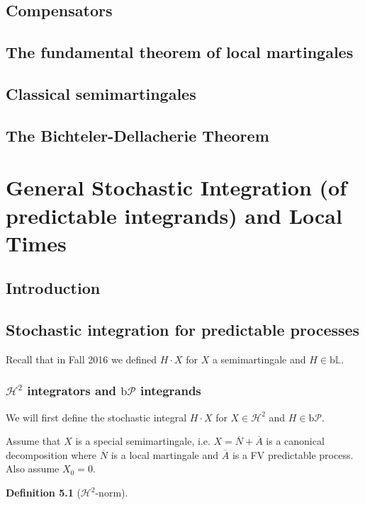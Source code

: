 \documentclass[openany,oneside]{book}
\theoremstyle{definition}
\newtheorem{defn}[thm]{Definition}
\theoremstyle{remark}
\newcommand{\sH}[1][2]{\mathcal{H}^{#1}} %
\newcommand{\pred}{\mathcal{P}} %
\newcommand{\bP}{\mathrm{b}\pred} %
\renewcommand{\L}{\mathbb{L}} %
\newcommand{\bL}{\mathrm{b}\L} %
\begin{document}
\section{Compensators}

\section{The fundamental theorem of local martingales}

\section{Classical semimartingales}

\section{The Bichteler-Dellacherie Theorem}


\chapter{General Stochastic Integration (of predictable integrands) and Local Times}

\section{Introduction}

\section{Stochastic integration for predictable processes}
Recall that in Fall 2016 we defined $H\cdot X$ for $X$ a semimartingale and $H\in \bL$.

\subsection{$\sH$ integrators and $\bP$ integrands}
We will first define the stochastic integral $H\cdot X$ for $X\in \sH$ and $H\in \bP$.

\par
Assume that $X$ is a special semimartingale, i.e. $X=\overline{N}+\overline{A}$ is a canonical decomposition where $\overline{N}$ is a local martingale and $\overline{A}$ is a FV predictable process. Also assume $X_0=0$.

\begin{defn}[$\sH$-norm]

\end{defn}
\end{document}
